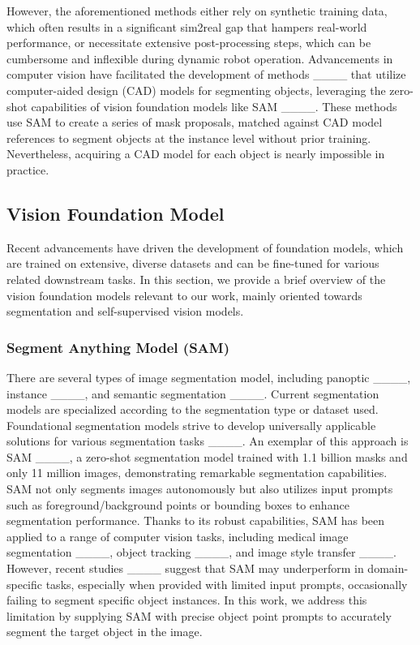 However, the aforementioned methods either rely on synthetic training data, which often results in a significant sim2real gap that hampers real-world performance, or necessitate extensive post-processing steps, which can be cumbersome and inflexible during dynamic robot operation. Advancements in computer vision have facilitated the development of methods ____ that utilize computer-aided design (CAD) models for segmenting objects, leveraging the zero-shot capabilities of vision foundation models like SAM ____. These methods use SAM to create a series of mask proposals, matched against CAD model references to segment objects at the instance level without prior training. Nevertheless, acquiring a CAD model for each object is nearly impossible in practice.

\subsection{Vision Foundation Model}
Recent advancements have driven the development of foundation models, which are trained on extensive, diverse datasets and can be fine-tuned for various related downstream tasks. In this section, we provide a brief overview of the vision foundation models relevant to our work, mainly oriented towards segmentation and self-supervised vision models.
\subsubsection{Segment Anything Model (SAM)}
There are several types of image segmentation model, including panoptic ____, instance ____, and semantic segmentation ____. Current segmentation models are specialized according to the segmentation type or dataset used. Foundational segmentation models strive to develop universally applicable solutions for various segmentation tasks ____. An exemplar of this approach is SAM ____, a zero-shot segmentation model trained with 1.1 billion masks and only 11 million images, demonstrating remarkable segmentation capabilities. SAM not only segments images autonomously but also utilizes input prompts such as foreground/background points or bounding boxes to enhance segmentation performance. Thanks to its robust capabilities, SAM has been applied to a range of computer vision tasks, including medical image segmentation ____, object tracking ____, and image style transfer ____. However, recent studies ____ suggest that SAM may underperform in domain-specific tasks, especially when provided with limited input prompts, occasionally failing to segment specific object instances. In this work, we address this limitation by supplying SAM with precise object point prompts to accurately segment the target object in the image.
